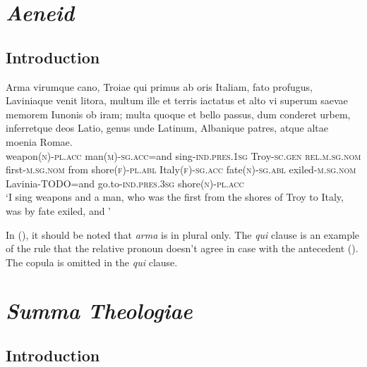 \documentclass[a4paper, oneside, 12pt]{report}
\newcommand{\form}[1]{\emph{#1}}
\newcommand*{\category}[1]{\textsc{#1}}
\newcommand{\translate}[1]{`#1'}
\newcommand{\literature}[1]{\textit{#1}}
\begin{document}
\section{\literature{Aeneid}}

\subsection{Introduction}



\begin{exe}
    \ex\label{ex:text.aeneid.1.1} \gll Arma virumque cano, Troiae qui primus ab oris
    Italiam, fato profugus, Laviniaque venit litora, 
    multum ille et terris iactatus et alto
    vi superum saevae memorem Iunonis ob iram;
    multa quoque et bello passus, dum conderet urbem,  
    inferretque deos Latio, genus unde Latinum,
    Albanique patres, atque altae moenia Romae. \\
    weapon(\category{n})-\category{pl}.\category{acc} 
    man(\category{m})-\category{sg}.\category{acc}=and 
    sing-\category{ind}.\category{pres}.\category{1sg}
    Troy-\category{sc}.\category{gen} 
    \category{rel}.\category{m}.\category{sg}.\category{nom}
    first-\category{m}.\category{sg}.\category{nom} 
    from shore(\category{f})-\category{pl}.\category{abl} 
    Italy(\category{f})-\category{sg}.\category{acc} 
    fate(\category{n})-\category{sg}.\category{abl} 
    exiled-\category{m}.\category{sg}.\category{nom} 
    Lavinia-TODO=and  
    go.to-\category{ind}.\category{pres}.\category{3sg} 
    shore(\category{n})-\category{pl}.\category{acc} \\
    \glt \translate{I sing weapons and a man, 
    who was the first from the shores of Troy to Italy, 
    was by fate exiled, 
    and }
\end{exe}

In (),
it should be noted that \form{arma} is in plural only.
The \form{qui} clause is an example of the rule 
that the relative pronoun doesn't agree in case 
with the antecedent ().
The copula is omitted in the \form{qui} clause.

\section{\literature{Summa Theologiae}}

\subsection{Introduction}
\end{document}
